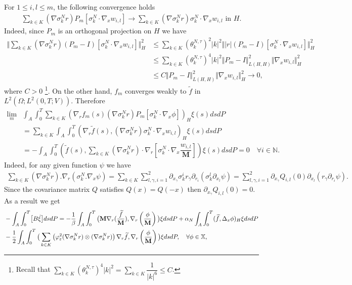 \documentclass[a4paper,12pt, reqno]{amsart}
\begin{document}
	For $1\leq  i,l\leq   m$,   the following   convergence holds
	\begin{align*}
		\sum_{k\in K}  (\nabla\sigma_k^Nr)P_m[\sigma_k^N\cdot\nabla_xw_{i,l} ]    \to \sum_{k\in K}  (\nabla\sigma_k^Nr)\sigma_k^N\cdot\nabla_xw_{i,l}   \text{  in  }  H. 
	\end{align*}
	Indeed, since   $P_m$   is  an  orthogonal projection  on  $H$  we  have
	\begin{align*}
		\Vert \sum_{k\in K}  (\nabla\sigma_k^Nr)(P_m-I)[\sigma_k^N\cdot\nabla_xw_{i,l} ]  \Vert_H^2&\leq    
		\sum_{k\in K} (\theta^{N,\tau}_k)^2\vert   k\vert^2 \Vert\vert   r\vert  (P_m-I)[\sigma_k^N\cdot\nabla_xw_{i,l} ]  \Vert_H^2\\   
		&\leq  \sum_{k\in K} (\theta^{N,\tau}_k)^4\vert   k\vert^2 \Vert P_m-I\Vert_{L(H,H)}^2\Vert\nabla_x w_{i,l}   \Vert_H^2\\
		&\leq  C \Vert P_m-I\Vert_{L(H,H)}^2\Vert \nabla_xw_{i,l}   \Vert_H^2 \to 0,
	\end{align*}
	where $C>0$ \footnote{
		Recall that     $\displaystyle\sum_{k\in K} (\theta^{N,\tau}_k)^4\vert   k\vert^2   = \sum_{k\in K} \dfrac{1}{\vert   k\vert^6}  \leq    C$.}.  On  the other   hand,   $f_m$   converges   weakly  to  $\widetilde f$   in $ L^2(\Omega ;L^2(0, T;V))$. Therefore
	\begin{align*}
		\lim_m        &\int_A\int_0^T\sum_{k\in K}(\nabla_rf_m(s)(\nabla\sigma_k^Nr)P_m[\sigma_k^N\cdot\nabla_x\phi ])_H \xi(s) dsdP\\
		&=\sum_{k\in K}\int_A\int_0^T(   \nabla_r\widetilde f(s),(\nabla\sigma_k^Nr)\sigma_k^N\cdot\nabla_xw_{i,l} )_H\xi(s)   dsdP\\
		&=-\int_A\int_0^T(  \widetilde f(s),\sum_{k\in K}(\nabla\sigma_k^Nr)\cdot\nabla_r[\sigma_k^N\cdot\nabla_x \dfrac{w_{i,l}}{\mathbf{M}}])\xi(s)   dsdP=0\quad   \forall i\in    \mathbb{N}.
	\end{align*}
	Indeed, for any given function $\psi$ we have  
	\begin{align*}
		\displaystyle\sum_{k\in K}	(\nabla \sigma_k^Nr).\nabla_r(\sigma_k^N.\nabla_x\psi)=\sum_{k\in K} \sum_{l,\gamma,i=1}^2 \partial_{x_\gamma}\sigma_k^ir_\gamma\partial_{r_i}(\sigma_k^l\partial_{x_l} \psi)=	\sum_{l,\gamma,i=1}^2\partial_{x_\gamma} Q_{i,l}(0)\partial_{x_l}(r_\gamma\partial_{r_i}\psi).
	\end{align*}
	Since   the covariance  matrix  $Q$ satisfies   $Q(x)=Q(-x)$ then   $\partial_{x_\gamma} Q_{i,l}(0)=0$. As a result we get
\begin{align*}&-\int_A\int_0^T\bigl[B\dot\xi \bigr]dsdP=-\dfrac{1}{\beta}\int_A\int_0^T\big(\mathbf{M}\nabla_r(\dfrac{\widetilde{f}}{\mathbf{M}}),\nabla_r\left(\dfrac{\phi}{\mathbf{M}}\right)\big) \xi dsdP+\alpha_N\int_A\int_0^T( \widetilde{f},\Delta_x \phi)_H\xi dsdP\\& - \dfrac{1}{2}\int_A\int_0^T\big(\sum_{k\in K}\left(\varphi_\varepsilon^2(\nabla \sigma_k^Nr) \otimes (\nabla \sigma_k^Nr)\right) \nabla_r\widetilde{f},\nabla_r\left(\dfrac{\phi}{\mathbf{M}}\right)\big)\xi dsdP,\quad \forall \phi \in \mathbb{X},\notag\end{align*}
\end{document}
